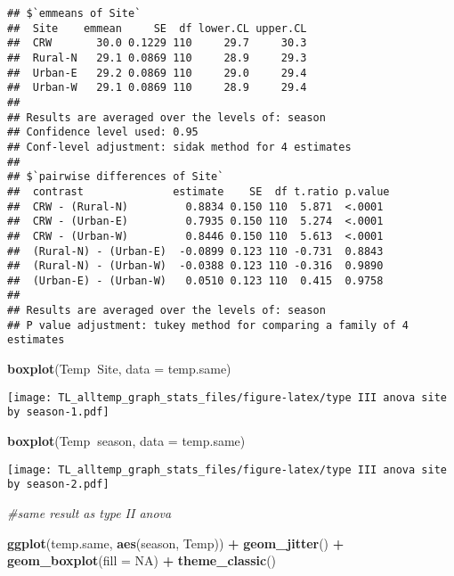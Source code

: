 \documentclass[
]{article}
\newenvironment{Shaded}{\begin{snugshade}}{\end{snugshade}}
\newcommand{\CommentTok}[1]{\textcolor[rgb]{0.56,0.35,0.01}{\textit{#1}}}
\newcommand{\DataTypeTok}[1]{\textcolor[rgb]{0.13,0.29,0.53}{#1}}
\newcommand{\KeywordTok}[1]{\textcolor[rgb]{0.13,0.29,0.53}{\textbf{#1}}}
\newcommand{\NormalTok}[1]{#1}
\newcommand{\OperatorTok}[1]{\textcolor[rgb]{0.81,0.36,0.00}{\textbf{#1}}}
\newcommand{\OtherTok}[1]{\textcolor[rgb]{0.56,0.35,0.01}{#1}}
\newcommand{\StringTok}[1]{\textcolor[rgb]{0.31,0.60,0.02}{#1}}
\begin{document}
\begin{verbatim}
## $`emmeans of Site`
##  Site    emmean     SE  df lower.CL upper.CL
##  CRW       30.0 0.1229 110     29.7     30.3
##  Rural-N   29.1 0.0869 110     28.9     29.3
##  Urban-E   29.2 0.0869 110     29.0     29.4
##  Urban-W   29.1 0.0869 110     28.9     29.4
## 
## Results are averaged over the levels of: season 
## Confidence level used: 0.95 
## Conf-level adjustment: sidak method for 4 estimates 
## 
## $`pairwise differences of Site`
##  contrast              estimate    SE  df t.ratio p.value
##  CRW - (Rural-N)         0.8834 0.150 110  5.871  <.0001 
##  CRW - (Urban-E)         0.7935 0.150 110  5.274  <.0001 
##  CRW - (Urban-W)         0.8446 0.150 110  5.613  <.0001 
##  (Rural-N) - (Urban-E)  -0.0899 0.123 110 -0.731  0.8843 
##  (Rural-N) - (Urban-W)  -0.0388 0.123 110 -0.316  0.9890 
##  (Urban-E) - (Urban-W)   0.0510 0.123 110  0.415  0.9758 
## 
## Results are averaged over the levels of: season 
## P value adjustment: tukey method for comparing a family of 4 estimates
\end{verbatim}

\begin{Shaded}
\begin{Highlighting}[]
\KeywordTok{boxplot}\NormalTok{(Temp}\OperatorTok{~}\NormalTok{Site, }\DataTypeTok{data =}\NormalTok{ temp.same)}
\end{Highlighting}
\end{Shaded}

\texttt{[image: TL\_alltemp\_graph\_stats\_files/figure-latex/type III anova site by season-1.pdf]}

\begin{Shaded}
\begin{Highlighting}[]
\KeywordTok{boxplot}\NormalTok{(Temp}\OperatorTok{~}\NormalTok{season, }\DataTypeTok{data =}\NormalTok{ temp.same)}
\end{Highlighting}
\end{Shaded}

\texttt{[image: TL\_alltemp\_graph\_stats\_files/figure-latex/type III anova site by season-2.pdf]}

\begin{Shaded}
\begin{Highlighting}[]
\CommentTok{#same result as type II anova}
\end{Highlighting}
\end{Shaded}

\begin{Shaded}
\begin{Highlighting}[]
\KeywordTok{ggplot}\NormalTok{(temp.same, }\KeywordTok{aes}\NormalTok{(season, Temp)) }\OperatorTok{+}\StringTok{ }
\StringTok{   }\KeywordTok{geom_jitter}\NormalTok{() }\OperatorTok{+}
\StringTok{   }\KeywordTok{geom_boxplot}\NormalTok{(}\DataTypeTok{fill =} \OtherTok{NA}\NormalTok{) }\OperatorTok{+}\StringTok{ }
\StringTok{   }\KeywordTok{theme_classic}\NormalTok{()}
\end{Highlighting}
\end{Shaded}
\end{document}
